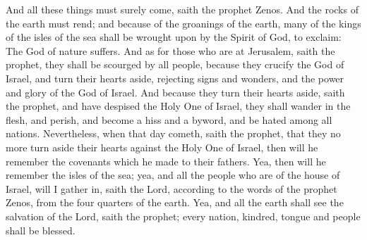 And all these things must surely come, saith the prophet Zenos. And the rocks of the earth must rend; and because of the groanings of the earth, many of the kings of the isles of the sea shall be wrought upon by the Spirit of God, to exclaim: The God of nature suffers.
\bverse \iffalse And as for those who are at Jerusalem, saith the prophet, they shall be scourged by all people, because they crucify the God of Israel, and turn their hearts aside, rejecting signs and wonders, and the power and glory of the God of Israel. \fi
And as for those who are at Jerusalem, saith the prophet, they shall be scourged by all people, because they crucify the God of Israel, and turn their hearts aside, rejecting signs and wonders, and the power and glory of the God of Israel.
\bverse \iffalse And because they turn their hearts aside, saith the prophet, and have despised the Holy One of Israel, they shall wander in the flesh, and perish, and become a hiss and a byword, and be hated among all nations. \fi
And because they turn their hearts aside, saith the prophet, and have despised the Holy One of Israel, they shall wander in the flesh, and perish, and become a hiss and a byword, and be hated among all nations.
\bverse \iffalse Nevertheless, when that day cometh, saith the prophet, that they no more turn aside their hearts against the Holy One of Israel, then will he remember the covenants which he made to their fathers. \fi
Nevertheless, when that day cometh, saith the prophet, that they no more turn aside their hearts against the Holy One of Israel, then will he remember the covenants which he made to their fathers.
\bverse \iffalse Yea, then will he remember the isles of the sea; yea, and all the people who are of the house of Israel, will I gather in, saith the Lord, according to the words of the prophet Zenos, from the four quarters of the earth. \fi
Yea, then will he remember the isles of the sea; yea, and all the people who are of the house of Israel, will I gather in, saith the Lord, according to the words of the prophet Zenos, from the four quarters of the earth.
\bverse \iffalse Yea, and all the earth shall see the salvation of the Lord, saith the prophet; every nation, kindred, tongue and people shall be blessed. \fi
Yea, and all the earth shall see the salvation of the Lord, saith the prophet; every nation, kindred, tongue and people shall be blessed.
\bverse \iffalse And I, Nephi, have written these things unto my people, that perhaps I might persuade them that they would remember the Lord their Redeemer. \fi

